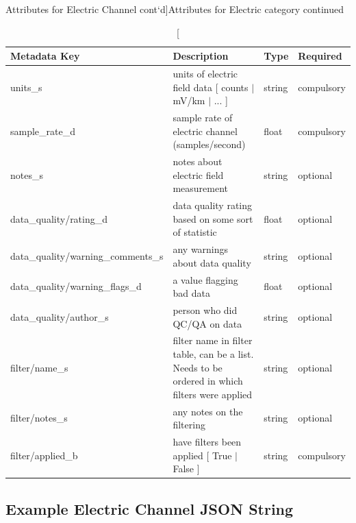 \documentclass{article}
\begin{document}
\newpage
\begin{table}[htb!]
	\caption[Attributes for Electric Channel cont`d]{Attributes for Electric category continued}
	\begin{tabular}{|l|p{3in}|l|l|}
		\hline
		\textbf{Metadata Key} & \textbf{Description} & \textbf{Type} & \textbf{Required} \\ \hline
		units\_s & units of electric field data [ counts $|$ mV/km $|$ ... ] & string & compulsory \\ \hline
		sample\_rate\_d & sample rate of electric channel (samples/second) & float & compulsory \\ \hline
		notes\_s & notes about electric field measurement & string &  optional \\ \hline
		data\_quality/rating\_d & data quality rating based on some sort of statistic & float & optional \\ \hline
		data\_quality/warning\_comments\_s & any warnings about data quality & string & optional \\ \hline
		data\_quality/warning\_flags\_d & a value flagging bad data  & float &  optional \\ \hline
		data\_quality/author\_s & person who did QC/QA on data & string &  optional \\ \hline
		filter/name\_s & filter name in filter table, can be a list. Needs to be ordered in which filters were applied & string &  optional \\ \hline
		filter/notes\_s & any notes on the filtering & string &  optional \\ \hline
		filter/applied\_b & have filters been applied [ True $|$ False ] & string & compulsory \\ \hline
		\end{tabular}
		\label{tab:electric02}
\end{table}	

\newpage
\subsection{Example Electric Channel JSON String}
\end{document}
